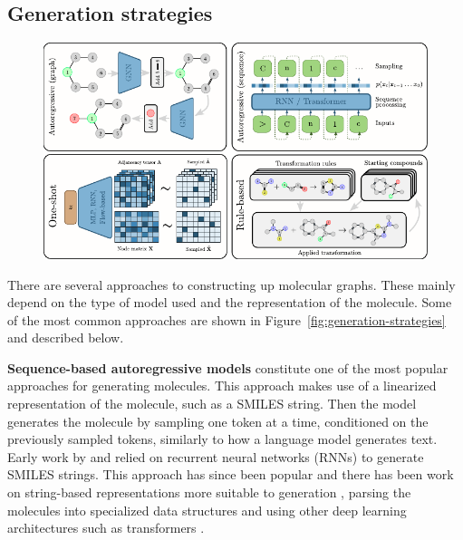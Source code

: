 \subsection{Generation strategies}
\begin{figure}
      \centering
      \includegraphics[width=\textwidth]{figures/generation_strategies_tryout.pdf}
\end{figure}
There are several approaches to constructing up molecular graphs. These mainly depend
on the type of model used and the representation of the molecule.
Some of the most common approaches are shown in Figure~\ref{fig:generation-strategies} and
described below.

\textbf{Sequence-based autoregressive models} constitute one of the most popular approaches for
generating molecules. This approach makes use of a linearized representation of the molecule, such
as a SMILES string. Then the model generates the molecule by sampling one token at a time,
conditioned on the previously sampled tokens, similarly to how a language model generates text.
Early work by \citep{seglerGeneratingFocusedMolecule2018} and
\citep{gomez-bombarelliAutomaticChemicalDesign2018} relied on recurrent neural networks (RNNs) to
generate SMILES strings. This approach has since been popular and there has been work on
string-based representations more suitable to generation
\citep{oboyleDeepSMILESAdaptationSMILES2018,krennSelfReferencingEmbeddedStrings2020,noutahiGottaBeSAFE2023},
parsing the molecules into specialized data structures
\citep{kusnerGrammarVariationalAutoencoder2017,jinJunctionTreeVariational2018} and using other deep
learning architectures such as transformers
\citep{vaswaniAttentionAllYou2017,noutahiGottaBeSAFE2023,schwallerMolecularTransformerModel2019,bagalMolGPTMolecularGeneration2022,mazuzMoleculeGenerationUsing2023}.

